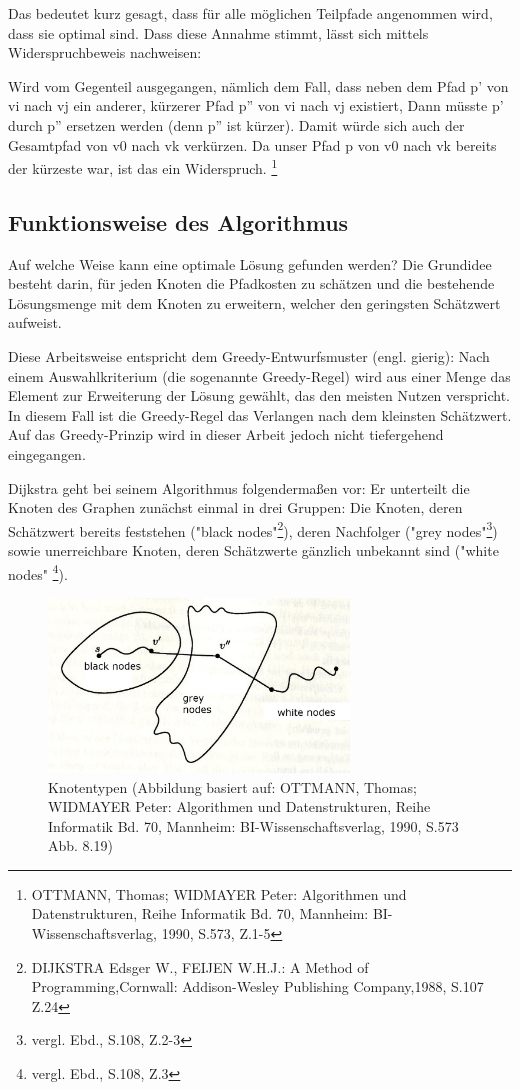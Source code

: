 \parindent0pt Das bedeutet kurz gesagt, dass  für alle möglichen Teilpfade angenommen wird, dass sie optimal sind.
Dass diese Annahme stimmt, lässt sich mittels Widerspruchbeweis nachweisen: 

\parindent0pt Wird vom Gegenteil ausgegangen, nämlich dem Fall, dass neben dem Pfad p' von v{\tiny i} nach v{\tiny j} ein anderer, kürzerer Pfad p'' von v{\tiny i }nach v{\tiny j} existiert, Dann müsste p' durch p'' ersetzen werden (denn p'' ist kürzer). Damit würde sich auch der Gesamtpfad von v{\tiny 0} nach v{\tiny k} verkürzen. Da unser Pfad p von v{\tiny 0} nach v{\tiny k} bereits der kürzeste war, ist das  ein Widerspruch. \footnote{OTTMANN, Thomas; WIDMAYER Peter: Algorithmen und Datenstrukturen, Reihe Informatik Bd. 70, Mannheim: BI-Wissenschaftsverlag, 1990, S.573, Z.1-5}


\subsection{Funktionsweise des Algorithmus}
Auf welche Weise kann eine optimale Lösung gefunden werden?
Die Grundidee besteht darin, für jeden Knoten die Pfadkosten zu schätzen und die bestehende Lösungsmenge mit dem Knoten zu erweitern, welcher den geringsten Schätzwert aufweist. 

\parindent0pt Diese Arbeitsweise entspricht dem Greedy-Entwurfsmuster (engl. gierig): Nach einem Auswahlkriterium (die sogenannte Greedy-Regel) wird aus einer Menge das Element zur Erweiterung der Lösung gewählt, das den meisten Nutzen verspricht. In diesem Fall ist die Greedy-Regel das Verlangen nach dem kleinsten Schätzwert.
Auf das Greedy-Prinzip wird in dieser Arbeit jedoch nicht tiefergehend eingegangen.

\parindent0pt Dijkstra geht bei seinem Algorithmus folgendermaßen vor: Er unterteilt die Knoten des Graphen zunächst einmal in drei Gruppen: Die Knoten, deren Schätzwert bereits feststehen ("black nodes"\footnote{DIJKSTRA Edsger W., FEIJEN W.H.J.: A Method of Programming,Cornwall: Addison-Wesley Publishing Company,1988, S.107 Z.24}), deren Nachfolger ("grey nodes"\footnote{vergl. Ebd., S.108, Z.2-3}) sowie unerreichbare Knoten, deren Schätzwerte gänzlich unbekannt sind ("white nodes" \footnote{vergl. Ebd., S.108, Z.3}).

\begin{figure}[h]
\centering
\includegraphics[width = 8cm, bb=0 0 300 400]{./chapters/knotentypen.jpg}
\caption{Knotentypen {\tiny (Abbildung basiert auf: OTTMANN, Thomas; WIDMAYER Peter: Algorithmen und Datenstrukturen, Reihe Informatik Bd. 70, Mannheim: BI-Wissenschaftsverlag, 1990, S.573 Abb. 8.19)} }
\label{a5}
\end{figure}


